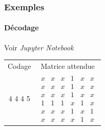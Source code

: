 \documentclass[11pt]{beamer}
\begin{document}
\begin{frame}
\frametitle{Exemples}
\framesubtitle{Décodage}

\begin{center}
Voir \textit{Jupyter Notebook}\\
\vspace{0.5cm}
\begin{table}[]
\centering
\begin{tabular}{c|c}
 Codage& Matrice attendue \\
 4 4 4 5& $\begin{array}{cccccc}
x & x & x & 1 & x & x \\ 
x & x & x & 1 & x & x \\ 
x & x & x & 1 & x & x \\ 
1 & 1 & 1 & x & 1 & x \\ 
x & x & x & 1 & x & 1 \\ 
x & x & x & x & 1 & x
\end{array}$
\end{tabular}
\end{table}
\end{center}
\end{frame}
\end{document}
